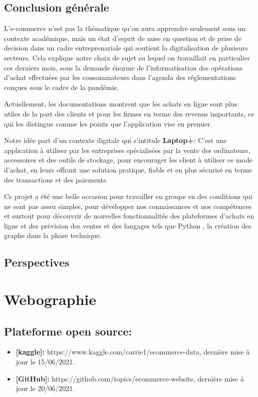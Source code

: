 \documentclass[a4paper]{report}
\begin{document}
\begin{doublespace}
	\section{Conclusion générale}
	L'e-commerce n'est pas la thématique qu'on aura
	apprendre seulement sous un contexte académique, mais un état d'esprit de mise
	en question et de prise de decision dans un cadre entreprenariale qui soutient
	la digitalisation de plusieurs secteurs. Cela explique notre choix de sujet su
	lequel on travaillait en particulier ces derniers mois, sous la demande énorme
	de l'informatisation des opérations d'achat effectuées par les consommateurs
	dans l'agenda des réglementations conçues sous le cadre de la pandémie.
	
	Actuellement, les documentations montrent que les
	achats en ligne sont plus utiles de la part des clients et pour les firmes en
	terme des revenus importants, ce qui les distingue comme les points que
	l'application vise en premier.
	
	Notre idée part d'un contexte digitale qui s'intitule
	\textbf{Laptop+}: C’est une application à utiliser par les entreprises
	spécialisées par la vente des ordinateurs, accessoires et des outils de
	stockage, pour encourager les client à utiliser ce mode d'achat, en leurs
	offrant une solution pratique, fiable et en plus  sécurisé en terme des
	transactions et des paiements.
	
	Ce projet a été une belle occasion pour travailler en
	groupe en des conditions qui ne sont pas assez simples, pour développer nos
	connaissances et nos compétences et surtout pour
	découvrir de nouvelles fonctionnalités des plateformes d'achats en ligne et des
	prévision des ventes et des langages tels que Python , la création des graphe
	dans la phase technique.
	\section{Perspectives}
\end{doublespace}
\chapter{Webographie}
\fancyhead[L]{\hspace*{5cm}}
\section{Plateforme open source:}
\begin{itemize}
	\item \textbf{[kaggle]:}
	      https://www.kaggle.com/carrie1/ecommerce-data, dernière mise à jour le
	      15/06/2021.
	\item \textbf{[GitHub]:}
	      https://github.com/topics/ecommerce-website, dernière mise à jour le
	      20/06/2021.
\end{itemize}
\end{document}
